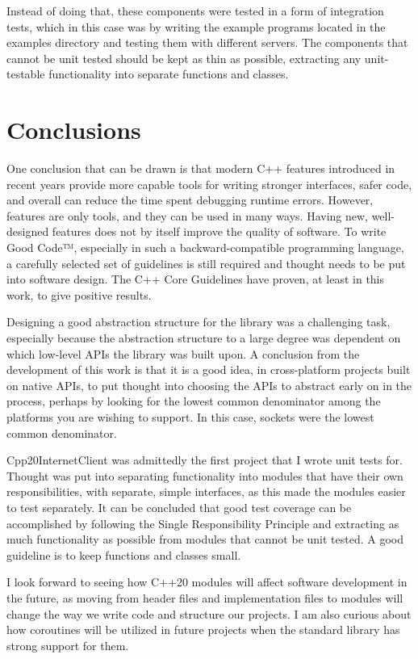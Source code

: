 \documentclass[12pt, a4paper]{article}
\begin{document}
Instead of doing that, these components were tested in a form of integration tests, which in this case was by writing the example programs located in the examples directory and testing them with different servers. The components that cannot be unit tested should be kept as thin as possible, extracting any unit-testable functionality into separate functions and classes.

\clearpage
\section{Conclusions}
One conclusion that can be drawn is that modern C++ features introduced in recent years provide more capable tools for writing stronger interfaces, safer code, and overall can reduce the time spent debugging runtime errors. However, features are only tools, and they can be used in many ways. Having new, well-designed features does not by itself improve the quality of software. To write Good Code™, especially in such a backward-compatible programming language, a carefully selected set of guidelines is still required and thought needs to be put into software design. The C++ Core Guidelines have proven, at least in this work, to give positive results.

Designing a good abstraction structure for the library was a challenging task, especially because the abstraction structure to a large degree was dependent on which low-level APIs the library was built upon. A conclusion from the development of this work is that it is a good idea, in cross-platform projects built on native APIs, to put thought into choosing the APIs to abstract early on in the process, perhaps by looking for the lowest common denominator among the platforms you are wishing to support. In this case, sockets were the lowest common denominator.

Cpp20InternetClient was admittedly the first project that I wrote unit tests for. Thought was put into separating functionality into modules that have their own responsibilities, with separate, simple interfaces, as this made the modules easier to test separately. It can be concluded that good test coverage can be accomplished by following the Single Responsibility Principle and extracting as much functionality as possible from modules that cannot be unit tested. A good guideline is to keep functions and classes small.

I look forward to seeing how C++20 modules will affect software development in the future, as moving from header files and implementation files to modules will change the way we write code and structure our projects. I am also curious about how coroutines will be utilized in future projects when the standard library has strong support for them.

\clearpage
\printbibliography
\end{document}
